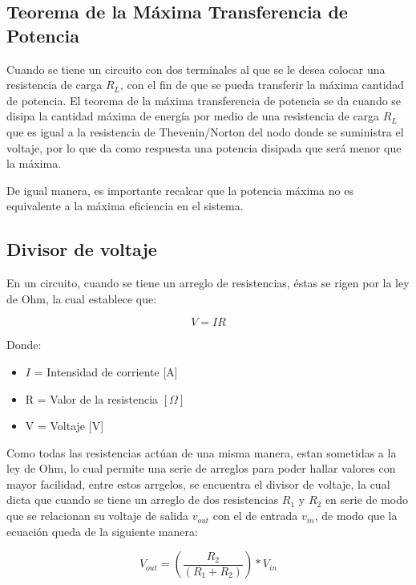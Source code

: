 \documentclass[]{article}
\begin{document}
\subsection{Teorema de la Máxima Transferencia de Potencia}

Cuando se tiene un circuito con dos terminales al que se le desea colocar una resistencia de carga $R_L$, con el fin de que se pueda 
transferir la máxima cantidad de potencia. El teorema de la máxima transferencia de potencia se da cuando se disipa la cantidad máxima de energía por medio de una resistencia de carga $R_L$ que es igual a la resistencia de Thevenin/Norton
del nodo donde se suministra el voltaje, por lo que da como respuesta una potencia disipada que será menor que la máxima. 

De igual manera, es importante recalcar que la potencia máxima no es equivalente a la máxima eficiencia en el sistema.

\subsection{Divisor de voltaje}

En un circuito, cuando se tiene un arreglo de resistencias, éstas se rigen por la ley de Ohm, la cual establece que:

\begin{equation*}
    V=IR 
\end{equation*}

Donde:
\begin{itemize}
    \item $I$ = Intensidad de corriente [A]
    \item R = Valor de la resistencia $[\Omega]$
    \item V = Voltaje [V]
\end{itemize}
    
Como todas las resistencias actúan de una misma manera, estan sometidas a la ley de Ohm, lo cual permite una serie de arreglos para poder hallar valores con mayor facilidad,
entre estos arrgelos, se encuentra el divisor de voltaje, la cual dicta que cuando se tiene un arreglo de dos resistencias $R_1$ y $R_2$ en serie de modo que se relacionan 
su voltaje de salida $v_{out}$ con el de entrada $v_{in}$, de modo que la ecuación queda de la siguiente manera:

\begin{equation*}
    V_{out}=(\frac{R_2}{(R_1+R_2)})*V_{in}
\end{equation*}
\end{document}
